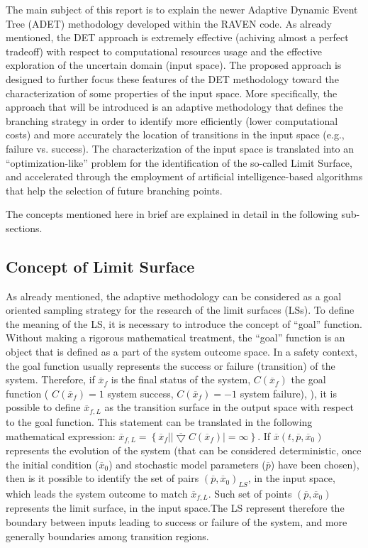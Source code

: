 \label{sec:DETRavenApproach}
The main subject of this report is to explain the newer Adaptive Dynamic Event Tree (ADET) methodology developed within the RAVEN code. As already mentioned, the DET approach is extremely effective (achiving almost a perfect tradeoff) with respect to computational resources usage and the effective exploration of the uncertain domain (input space). The proposed approach is designed to further focus these features of the DET methodology toward the characterization of some properties of the input space. More specifically, the approach that will be introduced is an adaptive methodology that defines the branching strategy in order to identify more efficiently (lower computational costs) and more accurately the location of transitions in the input space (e.g., failure vs. success). The characterization of the input space is translated into an “optimization-like” problem for the identification of the so-called Limit Surface, and accelerated through the employment of artificial intelligence-based algorithms that help the selection of future branching points.

The concepts mentioned here in brief are explained in detail in the following sub-sections.
\subsection{Concept of Limit Surface } 
\label{sec:LimitS}
 As already mentioned, the adaptive methodology can be considered as a goal oriented sampling strategy for the research of the limit surfaces (LSs). To define the meaning of the LS, it is necessary to introduce the concept of “goal” function. Without making a rigorous mathematical treatment, the “goal” function is an object that is defined as a part of the system outcome space. In a safety context, the goal function usually represents the success or failure (transition) of the system. Therefore, if $\overline{x}_{f}$ is the final status of the system, $C\left (\overline{x}_{f}\right )$ the goal function ( $C\left (\overline{x}_{f}\right ) = 1$ system success,  $C\left (\overline{x}_{f}\right ) = -1$ system failure), ), it is possible to define $\overline{x}_{f,L}$ as the transition surface in the output space with respect to the goal function. This statement can be translated in the following mathematical expression: $\overline{x}_{f,L} = \left \{ \overline{x}_{f}|\left | \overline{\bigtriangledown} C\left ( \overline{x}_{f} \right ) \right |= \infty \right \}$. If $\overline{x}\left (t,\overline{p},\overline{x}_{0}  \right )$ represents the evolution of the system (that can be considered deterministic, once the initial condition ($\overline{x}_{0} $) and stochastic model parameters ($\overline{p}$) have been chosen), then is it possible to identify the set of pairs $\left ( \overline{p},\overline{x}_{0} \right )_{LS}$, in the input space, which leads the system outcome to match $\overline{x}_{f,L}$. Such set of points $\left ( \overline{p},\overline{x}_{0} \right )$ represents the limit surface, in the input space.The LS represent therefore the boundary between inputs leading to success or failure of the system, and more generally boundaries among transition regions.

